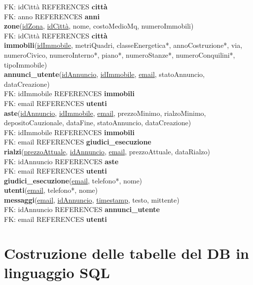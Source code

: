 \documentclass[a4paper,12pt]{report}
\begin{document}
            \null\quad\quad FK: idCittà REFERENCES \textbf{città} \\
            \null\quad\quad FK: anno REFERENCES \textbf{anni} \\
        \textbf{zone}(\underline{idZona}, \underline{idCittà}, nome, costoMedioMq, numeroImmobili) \\
            \null\quad\quad FK: idCittà REFERENCES \textbf{città} \\
        \textbf{immobili}(\underline{idImmobile}, metriQuadri, classeEnergetica*, annoCostruzione*, via, numeroCivico, numeroInterno*, piano*, numeroStanze*, numeroConquilini*, tipoImmobile) \\
        \textbf{annunci\_utente}(\underline{idAnnuncio}, \underline{idImmobile}, \underline{email}, statoAnnuncio, dataCreazione) \\
            \null\quad\quad FK: idImmobile REFERENCES \textbf{immobili} \\
            \null\quad\quad FK: email REFERENCES \textbf{utenti} \\
        \textbf{aste}(\underline{idAnnuncio}, \underline{idImmobile}, \underline{email}, prezzoMinimo, rialzoMinimo, depositoCauzionale, dataFine, statoAnnuncio, dataCreazione) \\
            \null\quad\quad FK: idImmobile REFERENCES \textbf{immobili} \\
            \null\quad\quad FK: email REFERENCES \textbf{giudici\_esecuzione} \\
        \textbf{rialzi}(\underline{prezzoAttuale}, \underline{idAnnuncio}, \underline{email}, prezzoAttuale, dataRialzo) \\
            \null\quad\quad FK: idAnnuncio REFERENCES \textbf{aste} \\
            \null\quad\quad FK: email REFERENCES \textbf{utenti} \\
        \textbf{giudici\_esecuzione}(\underline{email}, telefono*, nome) \\
        \textbf{utenti}(\underline{email}, telefono*, nome) \\
        \textbf{messaggi}(\underline{email}, \underline{idAnnuncio}, \underline{timestamp}, testo, mittente) \\
            \null\quad\quad FK: idAnnuncio REFERENCES \textbf{annunci\_utente} \\
            \null\quad\quad FK: email REFERENCES \textbf{utenti} \\
        	

            \section{Costruzione delle tabelle del DB in linguaggio SQL}
                
\end{document}
